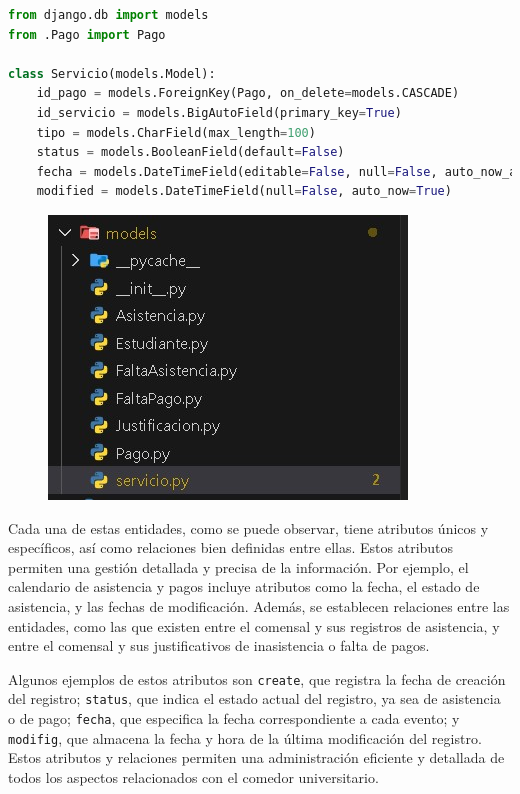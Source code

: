 \documentclass{article}
\begin{document}
\begin{lstlisting}[language=Python, caption={Servicio}]
from django.db import models
from .Pago import Pago

class Servicio(models.Model):
    id_pago = models.ForeignKey(Pago, on_delete=models.CASCADE)
    id_servicio = models.BigAutoField(primary_key=True)
    tipo = models.CharField(max_length=100)
    status = models.BooleanField(default=False)
    fecha = models.DateTimeField(editable=False, null=False, auto_now_add=True)
    modified = models.DateTimeField(null=False, auto_now=True)
\end{lstlisting}

\begin{figure}[H]
    \centering
    \includegraphics[scale=0.5]{img/Models.jpeg}
\end{figure}

	

	\item Cada una de estas entidades, como se puede observar, tiene atributos únicos y específicos, así como relaciones bien definidas entre ellas. Estos atributos permiten una gestión detallada y precisa de la información. Por ejemplo, el calendario de asistencia y pagos incluye atributos como la fecha, el estado de asistencia, y las fechas de modificación. Además, se establecen relaciones entre las entidades, como las que existen entre el comensal y sus registros de asistencia, y entre el comensal y sus justificativos de inasistencia o falta de pagos.
		
\item Algunos ejemplos de estos atributos son \texttt{create}, que registra la fecha de creación del registro; \texttt{status}, que indica el estado actual del registro, ya sea de asistencia o de pago; \texttt{fecha}, que especifica la fecha correspondiente a cada evento; y \texttt{modifig}, que almacena la fecha y hora de la última modificación del registro. Estos atributos y relaciones permiten una administración eficiente y detallada de todos los aspectos relacionados con el comedor universitario.
\end{document}
